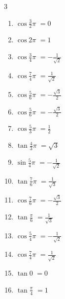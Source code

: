 \begin{multicols}{3}
\begin{enumerate}
  \item $\displaystyle \cos{\frac{3}{2}\pi}$
        $\displaystyle =0$

  \item $\displaystyle \cos{2\pi}$
        $\displaystyle =1$

  \item $\displaystyle \cos{\frac{3}{4}\pi}$
        $\displaystyle =-\frac{1}{\sqrt{2}}$

  \item $\displaystyle \cos{\frac{7}{4}\pi}$
        $\displaystyle =\frac{1}{\sqrt{2}}$

\columnbreak %

  \item $\displaystyle \cos{\frac{5}{6}\pi}$
        $\displaystyle =-\frac{\sqrt{3}}{2}$

  \item $\displaystyle \cos{\frac{5}{6}\pi}$
        $\displaystyle =-\frac{\sqrt{3}}{2}$

  \item $\displaystyle \cos{\frac{5}{3}\pi}$
        $\displaystyle =\frac{1}{2}$

  \item $\displaystyle \tan{\frac{4}{3}\pi}$
        $\displaystyle =\sqrt{3}$

  \item $\displaystyle \sin{\frac{5}{4}\pi}$
        $\displaystyle =-\frac{1}{\sqrt{2}}$

  \item $\displaystyle \tan{\frac{7}{6}\pi}$
        $\displaystyle =\frac{1}{\sqrt{3}}$

  \item $\displaystyle \cos{\frac{7}{6}\pi}$
        $\displaystyle =-\frac{\sqrt{3}}{2}$

  \item $\displaystyle \tan{\frac{\pi}{6}}$
        $\displaystyle =\frac{1}{\sqrt{3}}$

  \item $\displaystyle \cos{\frac{5}{4}\pi}$
        $\displaystyle =-\frac{1}{\sqrt{2}}$

  \item $\displaystyle \cos{\frac{7}{4}\pi}$
        $\displaystyle =\frac{1}{\sqrt{2}}$

  \item $\displaystyle \tan{0}$
        $\displaystyle =0$

  \item $\displaystyle \tan{\frac{\pi}{4}}$
        $\displaystyle =1$


\end{enumerate}
\end{multicols}
